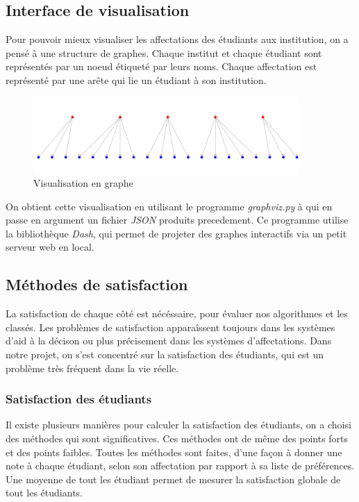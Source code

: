 \documentclass[12pt,titlepage]{article}
\begin{document}
\subsection{Interface de visualisation}

Pour pouvoir mieux visualiser les affectations des étudiants aux institution, on a pensé à une structure de graphes. Chaque institut et chaque étudiant sont représentés par un noeud étiqueté par leurs noms. Chaque affectation est représenté par une arête qui lie un étudiant à son institution.

\begin{figure}[!h]
  \centering
  \includegraphics[width = 0.9\textwidth]{img/Screen_graph_dash.png}
  \caption{Visualisation en graphe}
\end{figure}

On obtient cette visualisation en utilisant le programme \textit{graphviz.py} à qui en passe en argument un fichier \textit{JSON} produits precedement. Ce programme utilise la bibliothèque \textit{Dash}, qui permet de projeter des graphes interactifs via un petit serveur web en local.

\subsection{Méthodes de satisfaction}
La satisfaction de chaque côté est nécéssaire, pour évaluer nos algorithmes et les classés. Les problèmes de satisfaction apparaîssent toujours dans les systèmes d'aid à la décison ou plus précisement dans les systèmes d'affectations. Dans notre projet, on s'est concentré sur la satisfaction des étudiants, qui est un problème très fréquent dans la vie réelle. 
\subsubsection*{Satisfaction des étudiants}
Il existe plusieurs manières pour calculer la satisfaction des étudiants, on a choisi des méthodes qui sont significatives. Ces méthodes ont de même des points forts et des points faibles.
Toutes les méthodes sont faites, d'une façon à donner une note à chaque étudiant, selon son affectation par rapport à sa liste de préférences. Une moyenne de tout les étudiant permet de mesurer la satisfaction globale de tout les étudiants. 
\end{document}
